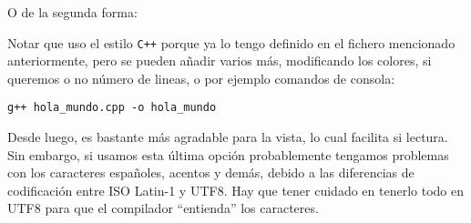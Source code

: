 O de la segunda forma:



Notar que uso el estilo \texttt{C++} porque ya lo tengo definido en el
fichero mencionado anteriormente, pero se pueden añadir varios más,
modificando los colores, si queremos o no número de lineas, o por
ejemplo comandos de consola:

\begin{lstlisting}[style=consola]
  g++ hola_mundo.cpp -o hola_mundo
\end{lstlisting}

Desde luego, es bastante más agradable para la vista, lo cual facilita
si lectura. Sin embargo, si usamos esta última opción probablemente
tengamos problemas con los caracteres españoles, acentos y demás,
debido a las diferencias de codificación entre ISO Latin-1 y UTF8. Hay
que tener cuidado en tenerlo todo en UTF8 para que el compilador
``entienda'' los caracteres.
